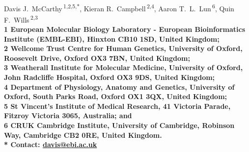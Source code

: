 \documentclass[10pt,letterpaper]{article}
\begin{document}
\vspace*{0.35in}

\begin{flushleft}
{\Large
\textbf{}
}
\newline
\\
Davis J.~McCarthy\,\textsuperscript{1,2,5,*},
Kieran R.~Campbell\,\textsuperscript{2,4},
Aaron T.~L.~Lun\,\textsuperscript{6},
Quin F.~Wills\,\textsuperscript{2,3}
\\
\bigskip
\bf{1} European Molecular Biology Laboratory - European Bioinformatics Institute (EMBL-EBI), Hinxton CB10 1SD, United Kingdom;
\\
\bf{2} Wellcome Trust Centre for Human Genetics, University of Oxford,
Roosevelt Drive, Oxford OX3 7BN, United Kingdom;
\\
\bf{3} Weatherall Institute for Molecular Medicine, University of Oxford, John Radcliffe Hospital, Oxford OX3 9DS, United Kingdom;
\\
\bf{4} Department of Physiology, Anatomy and Genetics, University of Oxford, South Parks Road, Oxford OX1 3QX, United Kingdom;
\\
\bf{5} St Vincent's Institute of Medical Research, 41 Victoria Parade, Fitzroy Victoria 3065, Australia; and
\\
\bf{6} CRUK Cambridge Institute, University of Cambridge, Robinson Way, Cambridge CB2 0RE, United Kingdom.
\\
\bigskip
* \textbf{Contact:} \href{davis@ebi.ac.uk}{davis@ebi.ac.uk}

\end{flushleft}
\end{document}
